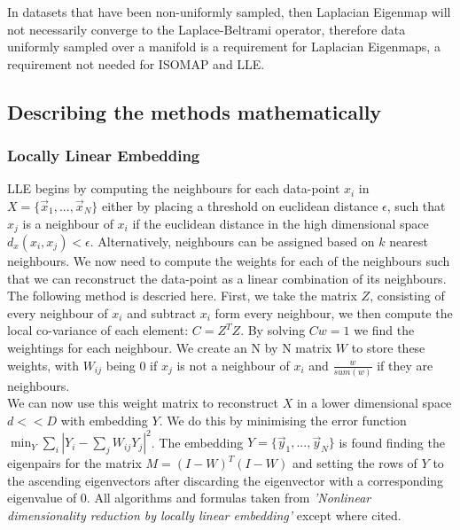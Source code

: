 \documentclass{article}
\begin{document}
In datasets that have been non-uniformly sampled, then Laplacian Eigenmap will not necessarily converge to the Laplace-Beltrami operator\cite{belkin2007convergence}, therefore data uniformly sampled over a manifold is a requirement for Laplacian Eigenmaps, a requirement not needed for ISOMAP and LLE.
\subsection{Describing the methods mathematically}
\subsubsection{Locally Linear Embedding}
LLE begins by computing the neighbours for each data-point $x_i$ in $X = \{\vec{x}_1,...,\vec{x}_N\}$ either by placing a threshold on euclidean distance $\epsilon$, such that $x_j$ is a neighbour of $x_i$ if the euclidean distance in the high dimensional space $d_x(x_i,x_j) < \epsilon$. Alternatively, neighbours can be assigned based on $k$ nearest neighbours. We now need to compute the weights for each of the neighbours such that we can reconstruct the data-point as a linear combination of its neighbours. The following method is descried here.\cite{LLERoweis} First, we take the matrix $Z$, consisting of every neighbour of $x_i$ and subtract $x_i$ form every neighbour, we then compute the local co-variance of each element: $C = Z^TZ$. By solving $Cw = 1$ we find the weightings for each neighbour. We create an N by N matrix $W$ to store these weights, with $W_{ij}$ being 0 if $x_j$ is not a neighbour of $x_i$ and $\frac{w}{sum(w)}$ if they are neighbours.\\
We can now use this weight matrix to reconstruct $X$ in a lower dimensional space $d<<D$ with embedding $Y$. We do this by minimising the error function $\min_Y\sum\limits_{i}|Y_i-\sum\limits_{j}W_{ij}Y_j|^2$.\cite{ghodsi2006dimensionality} The embedding $Y = \{\vec{y}_1,...,\vec{y}_N\}$ is found finding the eigenpairs for the matrix $M = (I-W)^T(I-W)$ and setting the rows of $Y$ to the ascending eigenvectors after discarding the eigenvector with a corresponding eigenvalue of 0.
All algorithms and formulas taken from \textit{'Nonlinear dimensionality reduction by locally linear embedding'}\cite{roweis2000nonlinear} except where cited.
\end{document}
